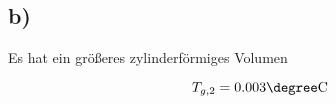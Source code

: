 

\subsection*{b)}

Es hat ein größeres zylinderförmiges Volumen

\[
T_{g,2} = 0.003 \degree \text{C}
\]